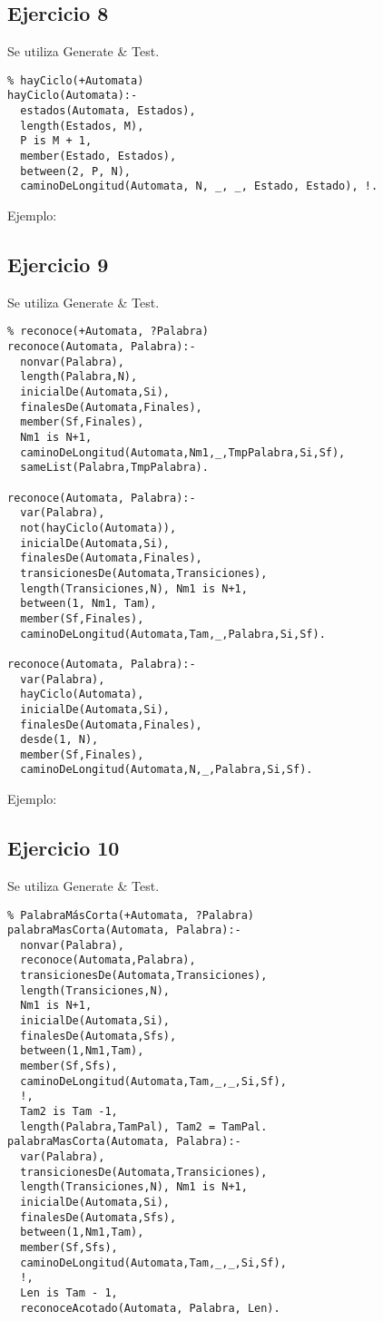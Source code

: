 \documentclass[10pt, a4paper,english,spanish,hidelinks]{article}
\begin{document}
\subsection{Ejercicio 8}

Se utiliza Generate & Test.

\begin{verbatim}
% hayCiclo(+Automata)
hayCiclo(Automata):-
  estados(Automata, Estados),
  length(Estados, M),
  P is M + 1,
  member(Estado, Estados),
  between(2, P, N),
  caminoDeLongitud(Automata, N, _, _, Estado, Estado), !.

\end{verbatim}

Ejemplo:

\subsection{Ejercicio 9}

Se utiliza Generate & Test.
\begin{verbatim}
% reconoce(+Automata, ?Palabra)
reconoce(Automata, Palabra):-
  nonvar(Palabra),
  length(Palabra,N),
  inicialDe(Automata,Si),
  finalesDe(Automata,Finales),
  member(Sf,Finales),
  Nm1 is N+1,
  caminoDeLongitud(Automata,Nm1,_,TmpPalabra,Si,Sf),
  sameList(Palabra,TmpPalabra).

reconoce(Automata, Palabra):-
  var(Palabra),
  not(hayCiclo(Automata)),
  inicialDe(Automata,Si),
  finalesDe(Automata,Finales),
  transicionesDe(Automata,Transiciones),
  length(Transiciones,N), Nm1 is N+1,
  between(1, Nm1, Tam),
  member(Sf,Finales),
  caminoDeLongitud(Automata,Tam,_,Palabra,Si,Sf).

reconoce(Automata, Palabra):-
  var(Palabra),
  hayCiclo(Automata),
  inicialDe(Automata,Si),
  finalesDe(Automata,Finales),
  desde(1, N),
  member(Sf,Finales),
  caminoDeLongitud(Automata,N,_,Palabra,Si,Sf).
\end{verbatim}

Ejemplo:


\subsection{Ejercicio 10}

Se utiliza Generate & Test.

\begin{verbatim}
% PalabraMásCorta(+Automata, ?Palabra)
palabraMasCorta(Automata, Palabra):-
  nonvar(Palabra),
  reconoce(Automata,Palabra),
  transicionesDe(Automata,Transiciones),
  length(Transiciones,N),
  Nm1 is N+1,
  inicialDe(Automata,Si),
  finalesDe(Automata,Sfs),
  between(1,Nm1,Tam),
  member(Sf,Sfs),
  caminoDeLongitud(Automata,Tam,_,_,Si,Sf),
  !,
  Tam2 is Tam -1,
  length(Palabra,TamPal), Tam2 = TamPal.
palabraMasCorta(Automata, Palabra):-
  var(Palabra),
  transicionesDe(Automata,Transiciones),
  length(Transiciones,N), Nm1 is N+1,
  inicialDe(Automata,Si),
  finalesDe(Automata,Sfs),
  between(1,Nm1,Tam),
  member(Sf,Sfs),
  caminoDeLongitud(Automata,Tam,_,_,Si,Sf),
  !,
  Len is Tam - 1,
  reconoceAcotado(Automata, Palabra, Len).


\end{verbatim}
							
\end{document}
